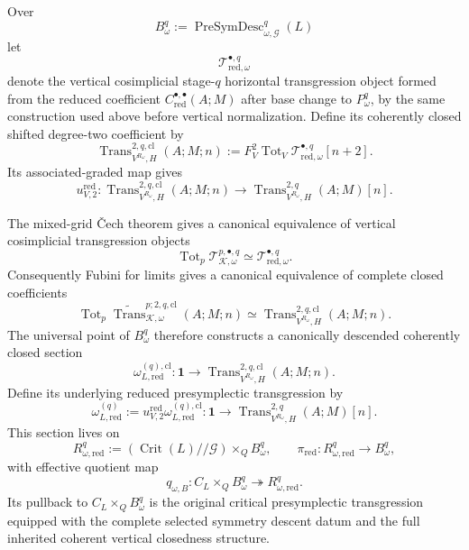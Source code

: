 \begin{theorem}
\label{thm:symmetry-noether-complete-presymplectic-descent-to-reduced-critical-calculus}
Over
\[
B_\omega^q:=\operatorname{PreSymDesc}_{\omega,\mathcal G}^{q}(L)
\]
let
\[
\mathscr T_{\mathrm{red},\omega}^{\bullet,q}
\]
denote the vertical cosimplicial stage-$q$ horizontal transgression object formed
from the reduced coefficient
$C_{\mathrm{red}}^{\bullet,\bullet}(A;M)$ after base change to $P_\omega^q$, by the
same construction used above before vertical normalization.  Define its coherently
closed shifted degree-two coefficient by
\[
\boxed{
\operatorname{Trans}_{V^{R_\omega},H}^{2,q,\mathrm{cl}}(A;M;n)
:=
F_V^2\operatorname{Tot}_V
\mathscr T_{\mathrm{red},\omega}^{\bullet,q}[n+2].
}
\]
Its associated-graded map gives
\[
\boxed{
u_{V,2}^{\mathrm{red}}:
\operatorname{Trans}_{V^{R_\omega},H}^{2,q,\mathrm{cl}}(A;M;n)
\longrightarrow
\operatorname{Trans}_{V^{R_\omega},H}^{2,q}(A;M)[n].
}
\]

The mixed-grid \v{C}ech theorem gives a canonical equivalence of vertical
cosimplicial transgression objects
\[
\boxed{
\operatorname{Tot}_p
\mathscr T_{\mathcal K,\omega}^{p,\bullet,q}
\simeq
\mathscr T_{\mathrm{red},\omega}^{\bullet,q}.
}
\]
Consequently Fubini for limits gives a canonical equivalence of complete closed
coefficients
\[
\boxed{
\operatorname{Tot}_p
\widetilde{\operatorname{Trans}}_{\mathcal K,\omega}^{p;2,q,\mathrm{cl}}(A;M;n)
\simeq
\operatorname{Trans}_{V^{R_\omega},H}^{2,q,\mathrm{cl}}(A;M;n).
}
\]
The universal point of $B_\omega^q$ therefore constructs a canonically descended
coherently closed section
\[
\boxed{
\omega_{L,\mathrm{red}}^{(q),\mathrm{cl}}:
\mathbf1
\longrightarrow
\operatorname{Trans}_{V^{R_\omega},H}^{2,q,\mathrm{cl}}(A;M;n).
}
\]
Define its underlying reduced presymplectic transgression by
\[
\boxed{
\omega_{L,\mathrm{red}}^{(q)}
:=
u_{V,2}^{\mathrm{red}}
\omega_{L,\mathrm{red}}^{(q),\mathrm{cl}}:
\mathbf1
\longrightarrow
\operatorname{Trans}_{V^{R_\omega},H}^{2,q}(A;M)[n].
}
\]
This section lives on
\[
R_{\omega,\mathrm{red}}^q
:=
\left(\operatorname{Crit}(L)//\mathcal G\right)\times_QB_\omega^q,
\qquad
\pi_{\mathrm{red}}:R_{\omega,\mathrm{red}}^q\to B_\omega^q,
\]
with effective quotient map
\[
q_{\omega,B}:
C_L\times_QB_\omega^q
\twoheadrightarrow
R_{\omega,\mathrm{red}}^q.
\]
Its pullback to $C_L\times_QB_\omega^q$ is the original critical presymplectic
transgression equipped with the complete selected symmetry descent datum and the
full inherited coherent vertical closedness structure.
\end{theorem}

